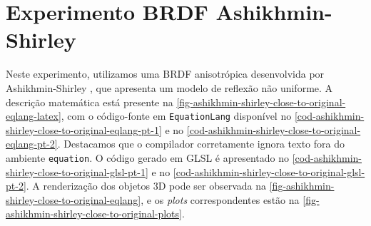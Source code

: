 
\section{Experimento BRDF Ashikhmin-Shirley}\label{sec:ashikhmin-shirley}

Neste experimento, utilizamos uma BRDF anisotrópica desenvolvida por Ashikhmin-Shirley \cite{ashikhmin2000anisotropic}, que apresenta um modelo de reflexão não uniforme. A descrição matemática está presente na \autoref{fig-ashikhmin-shirley-close-to-original-eqlang-latex}, com o código-fonte em \texttt{EquationLang} disponível no \autoref{cod-ashikhmin-shirley-close-to-original-eqlang-pt-1} e no \autoref{cod-ashikhmin-shirley-close-to-original-eqlang-pt-2}. Destacamos que o compilador corretamente ignora texto fora do ambiente \texttt{equation}. O código gerado em GLSL é apresentado no \autoref{cod-ashikhmin-shirley-close-to-original-glsl-pt-1} e no \autoref{cod-ashikhmin-shirley-close-to-original-glsl-pt-2}. A renderização dos objetos 3D pode ser observada na \autoref{fig-ashikhmin-shirley-close-to-original-eqlang}, e os \textit{plots} correspondentes estão na \autoref{fig-ashikhmin-shirley-close-to-original-plots}.
%

